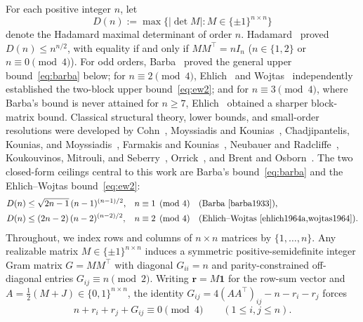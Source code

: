 \documentclass[11pt]{article}
\theoremstyle{remark}
\begin{document}
For each positive integer $n$, let
\[
  D(n) := \max \bigl\{ |\det M| : M \in \{\pm 1\}^{n \times n} \bigr\}
\]
denote the Hadamard maximal determinant of order $n$. Hadamard~\cite{hadamard1893} proved $D(n) \le n^{n/2}$, with equality if and only if $M M^\top = n I_n$ ($n \in \{1, 2\}$ or $n \equiv 0 \pmod 4$). For odd orders, Barba~\cite{barba1933} proved the general upper bound~\eqref{eq:barba} below; for $n \equiv 2 \pmod 4$, Ehlich~\cite{ehlich1964a} and Wojtas~\cite{wojtas1964} independently established the two-block upper bound~\eqref{eq:ew2}; and for $n \equiv 3 \pmod 4$, where Barba's bound is never attained for $n \ge 7$, Ehlich~\cite{ehlich1964b} obtained a sharper block-matrix bound. Classical structural theory, lower bounds, and small-order resolutions were developed by Cohn~\cite{cohn1963}, Moyssiadis and Kounias~\cite{moyssiadis1982}, Chadjipantelis, Kounias, and Moyssiadis~\cite{chadjipantelis1987}, Farmakis and Kounias~\cite{farmakis1987}, Neubauer and Radcliffe~\cite{neubauer1997}, Koukouvinos, Mitrouli, and Seberry~\cite{koukouvinos2000}, Orrick~\cite{orrick2005}, and Brent and Osborn~\cite{brent2013lower}. The two closed-form ceilings central to this work are Barba's bound~\eqref{eq:barba} and the Ehlich--Wojtas bound~\eqref{eq:ew2}:
\begin{align}
  D(n) &\le \sqrt{2n - 1}\,(n - 1)^{(n-1)/2}, && n \equiv 1 \pmod 4 \quad \text{(Barba~\cite{barba1933})}, \label{eq:barba}\\
  D(n) &\le (2n - 2)\,(n - 2)^{(n-2)/2}, && n \equiv 2 \pmod 4 \quad \text{(Ehlich--Wojtas~\cite{ehlich1964a,wojtas1964})}. \label{eq:ew2}
\end{align}
Throughout, we index rows and columns of $n \times n$ matrices by $\{1, \dots, n\}$. Any realizable matrix $M \in \{\pm 1\}^{n \times n}$ induces a symmetric positive-semidefinite integer Gram matrix $G = M M^\top$ with diagonal $G_{ii} = n$ and parity-constrained off-diagonal entries $G_{ij} \equiv n \pmod 2$. Writing $\mathbf{r} = M \mathbf{1}$ for the row-sum vector and $A = \frac{1}{2}(M + J) \in \{0, 1\}^{n \times n}$, the identity $G_{ij} = 4(A A^\top)_{ij} - n - r_i - r_j$ forces
\begin{equation}\label{eq:div4}
  n + r_i + r_j + G_{ij} \equiv 0 \pmod 4 \qquad (1 \le i, j \le n).
\end{equation}
\end{document}
